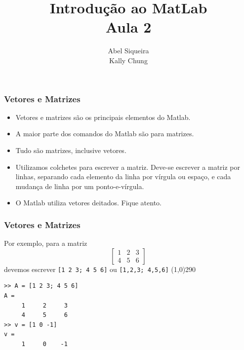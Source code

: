 \documentclass{beamer}
\title{Introdu\c{c}\~ao ao MatLab \\ Aula 2}
\author{Abel Siqueira \\ Kally Chung}
\date{}
\newcommand{\delim}{\line(1,0){290}}
\begin{document}
\frame{\titlepage}

\section[Vetores e Matrizes]{}
\begin{frame}[fragile]

  \frametitle{Vetores e Matrizes}
  
  \begin{itemize}
  \item<1-> Vetores e matrizes s\~ao os principais elementos do Matlab.
  \item<2-> A maior parte dos comandos do Matlab s\~ao para matrizes.
  \item<3-> Tudo s\~ao matrizes, inclusive vetores.
  \item<4-> Utilizamos colchetes para escrever a matriz. Deve-se escrever a matriz por linhas, separando cada elemento da linha por v\'irgula ou espa\c{c}o, e cada mudan\c{c}a de linha por um ponto-e-v\'irgula.
  \item<5-> O Matlab utiliza vetores deitados. Fique atento.
  \end{itemize}

\end{frame}

\begin{frame}[fragile]

\frametitle{Vetores e Matrizes} 
Por exemplo, para a matriz
$$\left[\begin{array}{ccc}1 & 2 & 3 \\ 4 & 5 & 6\end{array}\right]$$
devemos escrever {\tt [1 2 3; 4 5 6]} ou {\tt [1,2,3; 4,5,6]}
\pause
\delim
\begin{verbatim}
>> A = [1 2 3; 4 5 6]
A = 
     1     2     3
     4     5     6
>> v = [1 0 -1]
v =
     1     0    -1
\end{verbatim}
  
\end{frame}
\end{document}

